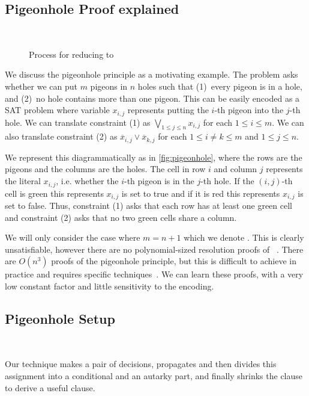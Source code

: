 \subsection{Pigeonhole Proof explained}~\label{app:pigeonhole}

\begin{figure*}[!t]
    \centering
    
    \caption{Process for reducing  to }
  \end{figure*}

We discuss the pigeonhole principle as a motivating example. The problem asks 
whether we can put $m$ pigeons in $n$ holes such that (1)~every pigeon is in a 
hole, and (2)~no hole contains more than one pigeon. This can be easily 
encoded as a SAT problem where variable $x_{i, j}$ represents putting the 
$i$-th pigeon into the $j$-th hole. We can translate constraint (1) as $\bigvee_{1 \leq j \leq n} x_{i, j}$ for each $1 \leq i \leq m$. We can also translate constraint (2) as $\overline{x}_{i, j} \lor \overline{x}_{k, j}$ for each $ 1 \leq i \neq k \leq m$ and $1 \leq j \leq n$.

We represent this diagrammatically as in \autoref{fig:pigeonhole}, where the rows are the pigeons and the columns are the holes. The cell in row $i$ and column $j$ represents the literal $x_{i, j}$, i.e. whether the $i$-th pigeon is in the $j$-th hole. If the $(i, j)$-th cell is green this represents $x_{i, j}$ is set to true and if it is red this represents $x_{i, j}$ is set to false. Thus, constraint (1) asks that each row has at least one green cell and constraint (2) asks that no two green cells share a column.

We will only consider the case where $m = n + 1$ which we denote . This is clearly unsatisfiable, however there are no polynomial-sized resolution proofs of ~\cite{hakenpigeonhole}. There are $O(n^3)$ \pr proofs of the pigeonhole principle, but this is difficult to achieve in practice and requires specific techniques~\cite{prclauses}. We can learn these proofs, with a very low constant factor and little sensitivity to the encoding.


\subsection{Pigeonhole Setup}~\label{subsec:pigeonhole-setup}

Our technique makes a pair of decisions, propagates and then divides this assignment into a conditional and an autarky part, and finally shrinks the clause to derive a useful \pr clause.

